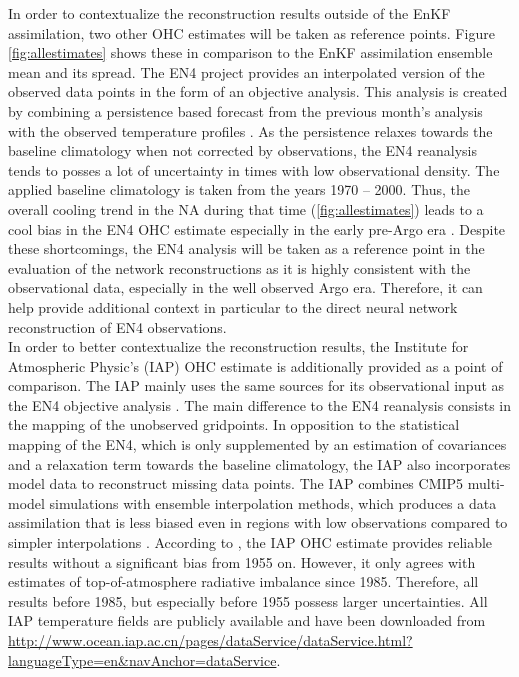 \documentclass[Masterarbeit.tex]{subfile}
\begin{document}
	
	In order to contextualize the reconstruction results outside of the EnKF assimilation, two other OHC estimates will be taken as reference points. Figure \ref{fig:allestimates} shows these in comparison to the EnKF assimilation ensemble mean and its spread. The EN4 project provides an interpolated version of the observed data points in the form of an objective analysis. This analysis is created by combining a persistence based forecast from the previous month's analysis with the observed temperature profiles \cite{good_en4_2013}. As the persistence relaxes towards the baseline climatology when not corrected by observations, the EN4 reanalysis tends to posses a lot of uncertainty in times with low observational density. The applied baseline climatology is taken from the years 1970 -- 2000. Thus, the overall cooling trend in the NA during that time (\ref{fig:allestimates}) leads to a cool bias in the EN4 OHC estimate especially in the early pre-Argo era \cite{good_en4_2013}. Despite these shortcomings, the EN4 analysis will be taken as a reference point in the evaluation of the network reconstructions as it is highly consistent with the observational data, especially in the well observed Argo era. Therefore, it can help provide additional context in particular to the direct neural network reconstruction of EN4 observations.\\
	In order to better contextualize the reconstruction results, the Institute for Atmospheric Physic's (IAP) OHC estimate is additionally provided as a point of comparison. The IAP mainly uses the same sources for its observational input as the EN4 objective analysis \citep{cheng_iap_2016}. The main difference to the EN4 reanalysis consists in the mapping of the unobserved gridpoints. In opposition to the statistical mapping of the EN4, which is only supplemented by an estimation of covariances and a relaxation term towards the baseline climatology, the IAP also incorporates model data to reconstruct missing data points. The IAP combines CMIP5 multi-model simulations with ensemble interpolation methods, which produces a data assimilation that is less biased even in regions with low observations compared to simpler interpolations \cite{cheng_iap_2016}. According to \cite{cheng_iap_2016}, the IAP OHC estimate provides reliable results without a significant bias from 1955 on. However, it only agrees with estimates of top-of-atmosphere radiative imbalance since 1985. Therefore, all results before 1985, but especially before 1955 possess larger uncertainties. All IAP temperature fields are publicly available and have been downloaded from \url{http://www.ocean.iap.ac.cn/pages/dataService/dataService.html?languageType=en&navAnchor=dataService}. \\
	
\end{document}
